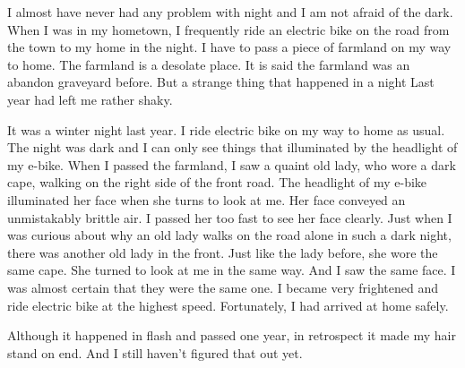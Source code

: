 \documentclass[12pt,a4paper]{caspset}
\begin{document}

I almost have never had any problem with night and I am not afraid of the dark. When I was in my hometown, I frequently ride an electric bike on the road from the town to my home in the night. I have to pass a piece of farmland on my way to home. The farmland is a desolate place. It is said the farmland was an abandon graveyard before. But a strange thing that happened in a night Last year had left me rather shaky.

It was a winter night last year. I ride electric bike on my way to home as usual. The night was dark and I can only see things that illuminated by the headlight of my e-bike. When I passed the farmland, I saw a quaint old lady, who wore a dark cape, walking on the right side of the front road. The headlight of my e-bike illuminated her face when she turns to look at me. Her face conveyed an unmistakably brittle air. I passed her too fast to see her face clearly. Just when I was curious about why an old lady walks on the road alone in such a dark night, there was another old lady in the front. Just like the lady before, she wore the same cape. She turned to look at me in the same way. And I saw the same face. I was almost certain that they were the same one. I became very frightened and ride electric bike at the highest speed. Fortunately, I had arrived at home safely.

Although it happened in flash and passed one year, in retrospect it made my hair stand on end.  And I still haven't figured that out yet.
\end{document}
